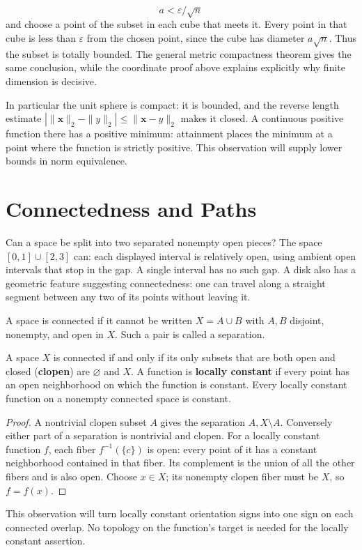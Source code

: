 \[
a<\varepsilon/\sqrt n
\]
 and choose a point of the subset in each cube
that meets it. Every point in that cube is less than $\varepsilon$ from
the chosen point, since the cube has diameter $a\sqrt n$. Thus the subset
is totally bounded. The general metric compactness theorem gives the
same conclusion, while the coordinate proof above explains explicitly
why finite dimension is decisive.

In particular the unit sphere is compact: it is bounded, and the reverse
length estimate $|\|\mathbf{x}\|_2-\|y\|_2|\leq\|\mathbf{x}-y\|_2$ makes it closed.
A continuous positive function there has a positive minimum: attainment
places the minimum at a point where the function is strictly positive.
This observation will supply lower bounds in norm equivalence.

\section{Connectedness and Paths}
Can a space be split into two separated nonempty open pieces? The space
$[0,1]\cup[2,3]$ can: each displayed interval is relatively open, using
ambient open intervals that stop in the gap. A single interval has no such
gap. A disk also has a geometric feature suggesting connectedness: one can
travel along a straight segment between any two of its points without leaving it.
\begin{definition}[Connectedness]\label{def:connectedness}
A space is connected if it cannot be written $X=A\cup B$ with $A,B$
disjoint, nonempty, and open in $X$. Such a pair is called a separation.
\end{definition}
\begin{proposition}
\label{prop:clopen-locally-constant}
A space $X$ is connected if and only if its only subsets that are both
open and closed (\textbf{clopen}) are $\varnothing$ and $X$.
A function is \textbf{locally constant} if every point has an open
neighborhood on which the function is constant. Every locally constant
function on a nonempty connected space is constant.
\end{proposition}
\begin{proof}
A nontrivial clopen subset $A$ gives the separation $A,X\setminus A$.
Conversely either part of a separation is nontrivial and clopen.
For a locally constant function $f$, each fiber $f^{-1}(\{c\})$ is open:
every point of it has a constant neighborhood contained in that fiber.
Its complement is the union of all the other fibers and is also open.
Choose $x\in X$; its nonempty clopen fiber must be $X$, so $f=f(x)$.
\end{proof}
This observation will turn locally constant orientation signs into one
sign on each connected overlap. No topology on the function's target is
needed for the locally constant assertion.

